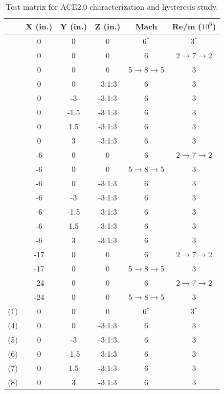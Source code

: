 \setcounter{rownum}{0}
\begin{table}[ht]
    \centering
    \begin{tabular}{|>{\stepcounter{rownum}\therownum}c|c|c|c|c|c|}
        \hline
        \multicolumn{1}{|c|}{\textbf{Run}} & \textbf{X (in.)} & \textbf{Y (in.)} & \textbf{Z (in.)} & \textbf{Mach} & \textbf{Re/m ($10^6$)} \\ \hline
        & 0 & 0 & 0 & 6$^*$ & 3$^*$ \\ \hline
        & 0 & 0 & 0 & 6 & 2$\to$7$\to$2 \\ \hline
        & 0 & 0 & 0 & 5$\to$8$\to$5 & 3 \\ \hline
        & 0 & 0 & -3:1:3 & 6 & 3 \\ \hline
        & 0 & -3 & -3:1:3 & 6 & 3 \\ \hline
        & 0 & -1.5 & -3:1:3 & 6 & 3 \\ \hline
        & 0 & 1.5 & -3:1:3 & 6 & 3 \\ \hline
        & 0 & 3 & -3:1:3 & 6 & 3 \\ \hline
        & -6 & 0 & 0 & 6 & 2$\to$7$\to$2 \\ \hline
        & -6 & 0 & 0 & 5$\to$8$\to$5 & 3 \\ \hline
        & -6 & 0 & -3:1:3 & 6 & 3 \\ \hline
        & -6 & -3 & -3:1:3 & 6 & 3 \\ \hline
        & -6 & -1.5 & -3:1:3 & 6 & 3 \\ \hline
        & -6 & 1.5 & -3:1:3 & 6 & 3 \\ \hline
        & -6 & 3 & -3:1:3 & 6 & 3 \\ \hline
        & -17 & 0 & 0 & 6 & 2$\to$7$\to$2 \\ \hline
        & -17 & 0 & 0 & 5$\to$8$\to$5 & 3 \\ \hline
        & -24 & 0 & 0 & 6 & 2$\to$7$\to$2 \\ \hline
        & -24 & 0 & 0 & 5$\to$8$\to$5 & 3 \\ \hline
        (1) & 0 & 0 & 0 & 6$^*$ & 3$^*$ \\ \hline
        (4) & 0 & 0 & -3:1:3 & 6 & 3 \\ \hline
        (5) & 0 & -3 & -3:1:3 & 6 & 3 \\ \hline
        (6) & 0 & -1.5 & -3:1:3 & 6 & 3 \\ \hline
        (7) & 0 & 1.5 & -3:1:3 & 6 & 3 \\ \hline
        (8) & 0 & 3 & -3:1:3 & 6 & 3 \\ \hline
    \end{tabular}
    \caption{Test matrix for ACE2.0 characterization and hysteresis study.}
    \label{tab:ace2-survey}
\end{table}

